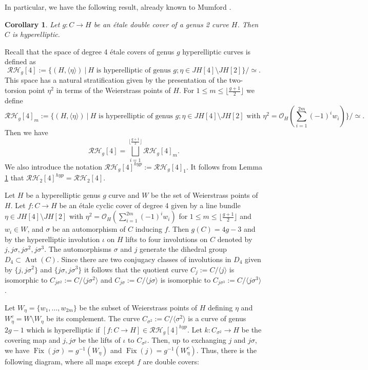 \documentclass{article}
\newtheorem{cor}[thm]{Corollary}
\numberwithin{equation}{section}
\newcommand{\s}{\sigma}
\DeclareMathOperator{\Aut}{Aut}
\DeclareMathOperator{\Fix}{Fix}
\begin{document}
In particular, we have the following result, already known to Mumford \cite{MR379510}.

\begin{cor}
\label{genus3hyperelliptic}
    Let $g: C \to H$ be an \'etale double cover of a genus 2 curve $H$. Then $C$ is hyperelliptic.
\end{cor}

Recall that the space of degree 4 \'etale covers of genus \(g\) hyperelliptic curves is defined as $$\mathcal{RH}_g[4] := \{(H, \langle\eta\rangle) \: | \: H \text{ is hyperelliptic of genus } g; \eta \in JH[4]\setminus JH[2]\}/\simeq.$$ This space has a natural stratification given by the presentation of the two-torsion point $\eta^2$ in terms of the Weierstrass points of $H$. For $1 \leq m \leq \lfloor \frac{g+1}{2}\rfloor$ we define $$\mathcal{RH}_g[4]_{m} := \{(H, \langle\eta\rangle) \: | \: H \text{ is hyperelliptic of genus } g; \eta \in JH[4]\setminus JH[2] \text{ with } \eta^2 = \mathcal{O}_H(\sum_{i=1}^{2m}(-1)^iw_i)\}/\simeq.$$ Then we have $$\mathcal{RH}_g[4] = \bigsqcup_{i=1}^{\lfloor \frac{g+1}{2}\rfloor} \mathcal{RH}_g[4]_m.$$ 
We also introduce the notation $\mathcal{RH}_g[4]^{hyp} := \mathcal{RH}_g[4]_1$. It follows from Lemma \ref{genus3hyperelliptic} that $\mathcal{RH}_2[4]^{hyp} = \mathcal{RH}_2[4]$.  

Let $H$ be a hyperelliptic genus $g$ curve and $W$ be the set of Weierstrass points of $H$. Let $f: C \to H$ be an \'etale cyclic cover of degree 4 given by a line bundle $\eta \in JH[4]\setminus JH[2]$ with $\eta^2 = \mathcal{O}_H\left(\sum_{i=1}^{2m}(-1)^iw_i\right)$ for $1 \leq m \leq \lfloor \frac{g+1}{2}\rfloor$ and $w_i \in W$, and $\sigma$ be an automorphism of $C$ inducing $f$. Then $g(C) = 4g-3$ and by \cite{ries} the hyperelliptic involution $\iota$ on $H$ lifts to four involutions on $C$ denoted by $j, j\s, j\s^2, j\s^3$. The automorphisms $\sigma$ and $j$ generate the dihedral group $D_4 \subset \Aut(C)$. Since there are two conjugacy classes of involutions in $D_4$ given by $\{j, j\s^2\}$ and $\{j\s, j\s^3\}$ it follows that the quotient curve $C_{j} := C/\langle j\rangle$ is isomorphic to $C_{j\s^2} := C/\langle j\s^2\rangle$ and $C_{j\s} := C/\langle j\s\rangle$ is isomorphic to $C_{j\s^3} := C/\langle j\s^3\rangle$. 

Let $W_{\eta} = \{w_1,\ldots, w_{2m}\}$ be the subset of Weierstrass points of $H$ defining $\eta$ and $W^c_{\eta} = W \setminus W_{\eta}$ be its complement. The curve $C_{\sigma^2} := C/\langle \s^2 \rangle$ is a curve of genus $2g-1$ which is hyperelliptic if $[f:C \to H] \in \mathcal{RH}_g[4]^{hyp}$. Let $k: C_{\s^2} \to H$ be the covering map and $j, j\sigma$ be the lifts of $\iota$ to $C_{\s^2}$. Then, up to exchanging $j$ and $j\sigma$, we have $\Fix(j\s) = g^{-1}(W_{\eta})$ and $\Fix(j) = g^{-1}(W_{\eta}^c)$. Thus, there is the following diagram, where all maps except $f$ are double covers: 
\end{document}

